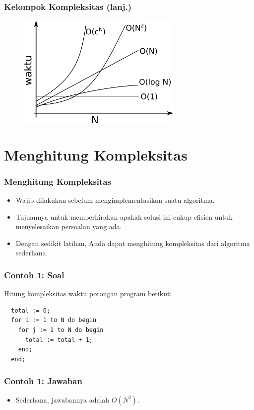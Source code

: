 \documentclass{beamer}
\begin{document}
\begin{frame}
\frametitle{Kelompok Kompleksitas (lanj.)}
\begin{figure}
  \includegraphics[width=8cm]{asset/grafik.png}
\end{figure}
\end{frame}

\section{Menghitung Kompleksitas}
\frame{\sectionpage}

\begin{frame}
\frametitle{Menghitung Kompleksitas}
\begin{itemize}
  \item Wajib dilakukan sebelum mengimplementasikan suatu algoritma.
  \item Tujuannya untuk memperkirakan apakah solusi ini cukup efisien untuk menyelesaikan persoalan yang ada.
  \item Dengan sedikit latihan, Anda dapat menghitung kompleksitas dari algoritma sederhana.
\end{itemize}
\end{frame}

\begin{frame}[fragile]
\frametitle{Contoh 1: Soal}
Hitung kompleksitas waktu potongan program berikut:

\hfill

\begin{lstlisting}
  total := 0;
  for i := 1 to N do begin
    for j := 1 to N do begin
      total := total + 1;
    end;
  end;
\end{lstlisting}
\end{frame}

\begin{frame}
\frametitle{Contoh 1: Jawaban}
\begin{itemize}
  \item Sederhana, jawabannya adalah $O(N^2)$.
\end{itemize}
\end{frame}
\end{document}
